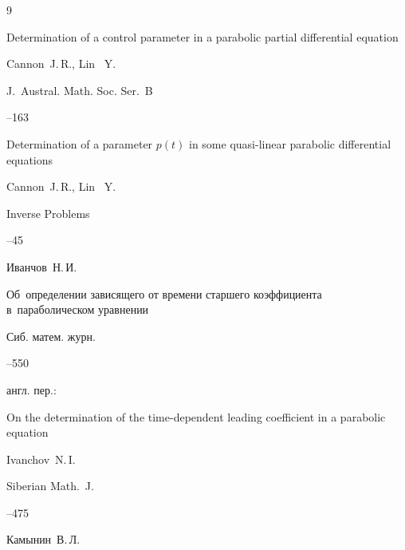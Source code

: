 \begin{thebibliography}{9}




\paper Determination of a control parameter in a parabolic partial differential equation

\by Cannon~J.\,R., Lin ~Y.

\jour J.~Austral. Math. Soc. Ser.~B




--163




\paper Determination of a parameter $p(t)$ in some quasi-linear parabolic differential equations

\by Cannon~J.\,R., Lin ~Y.

\jour Inverse Problems




--45






\by Иванчов~Н.\,И.

\paper Об~определении зависящего от времени старшего коэффициента в~параболическом уравнении

\jour Сиб. матем. журн.




--550

\transl англ. пер.:~

\paper On the determination of the time-dependent leading coefficient in a parabolic equation

\by Ivanchov~N.\,I.

\jour Siberian Math.~J.




--475




\by Камынин~В.\,Л.


\end{thebibliography}
